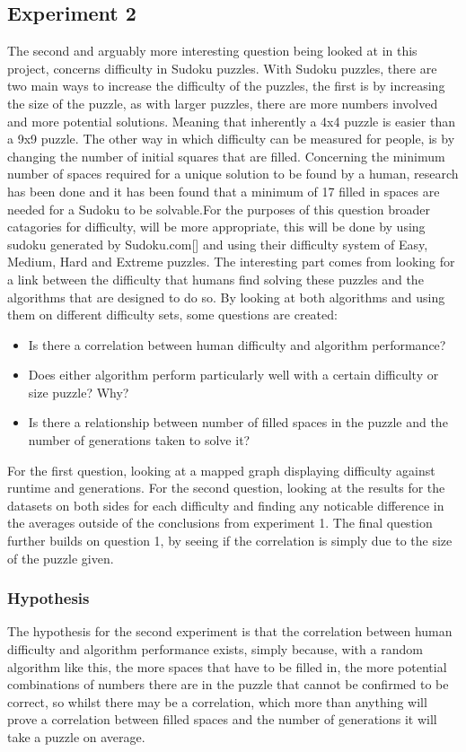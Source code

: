 \documentclass[a4paper,11pt]{article}
\begin{document}
\subsection{Experiment 2}
The second and arguably more interesting question being looked at in this project, concerns difficulty in Sudoku puzzles. With Sudoku puzzles, there are two main ways to increase the difficulty of the puzzles, the first is by increasing the size of the puzzle, as with larger puzzles, there are more numbers involved and more potential solutions. Meaning that inherently a 4x4 puzzle is easier than a 9x9 puzzle. The other way in which difficulty can be measured for people, is by changing the number of initial squares that are filled. Concerning the minimum number of spaces required for a unique solution to be found by a human, research has been done and it has been found that a minimum of 17 filled in spaces are needed for a Sudoku to be solvable.\newline \newline For the purposes of this question broader catagories for difficulty, will be more appropriate, this will be done by using sudoku generated by Sudoku.com[] and using their difficulty system of Easy, Medium, Hard and Extreme puzzles. The interesting part comes from looking for a link between the difficulty that humans find solving these puzzles and the algorithms that are designed to do so. By looking at both algorithms and using them on different difficulty sets, some questions are created:
\begin{itemize}
	\item Is there a correlation between human difficulty and algorithm performance?
	\item Does either algorithm perform particularly well with a certain difficulty or size puzzle? Why?
	\item Is there a relationship between number of filled spaces in the puzzle and the number of  generations taken to solve it?
\end{itemize}
For the first question, looking at a mapped graph displaying difficulty against runtime and generations. For the second question, looking at the results for the datasets on both sides for each difficulty and finding any noticable difference in the averages outside of the conclusions from experiment 1. The final question further builds on question 1, by seeing if the correlation is simply due to the size of the puzzle given.
\subsubsection{Hypothesis}
The hypothesis for the second experiment is that the correlation between human difficulty and algorithm performance exists, simply because, with a random algorithm like this, the more spaces that have to be filled in, the more potential combinations of numbers there are in the puzzle that cannot be confirmed to be correct, so whilst there may be a correlation, which more than anything will prove a correlation between filled spaces and the number of generations it will take a puzzle on average.
\end{document}
